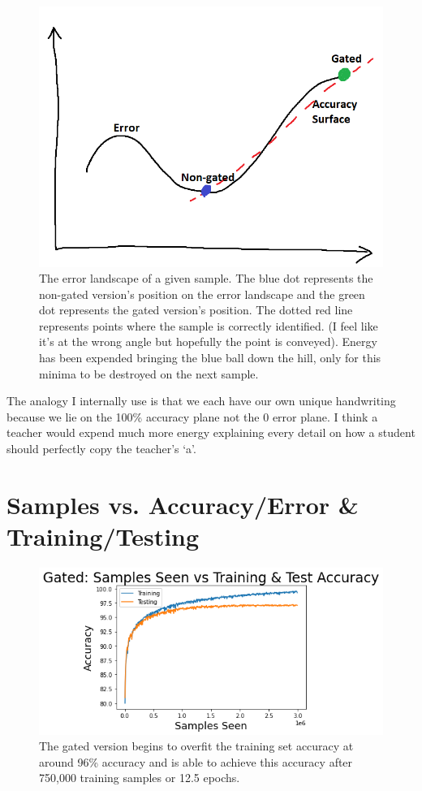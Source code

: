 \documentclass[prl,superscriptaddress,showpacs,twocolumn]{revtex4-1}
\begin{document}
\begin{figure}[H]
    \centering
    \includegraphics[width=\linewidth]{figures/explanation.png}
    \caption{The error landscape of a given sample. The blue dot represents the non-gated version's position on the error landscape and the green dot represents the gated version's position. The dotted red line represents points where the sample is correctly identified. (I feel like it's at the wrong angle but hopefully the point is conveyed). Energy has been expended bringing the blue ball down the hill, only for this minima to be destroyed on the next sample.}
    \label{fig:explanation}
\end{figure}

\indent
The analogy I internally use is that we each have our own unique handwriting because we lie on the 100\% accuracy plane not the 0 error plane. I think a teacher would expend much more energy explaining every detail on how a student should perfectly copy the teacher's `a'.


\section{Samples vs. Accuracy/Error \& Training/Testing}
\begin{figure}[H]
    \centering
    \includegraphics[width=\linewidth]{figures/gated_samples_vs_train_test_accuracy.png}
    \caption{The gated version begins to overfit the training set accuracy at around 96\% accuracy and is able to achieve this accuracy after 750,000 training samples or 12.5 epochs.}
    \label{fig:gated_acc}
\end{figure}
\end{document}
